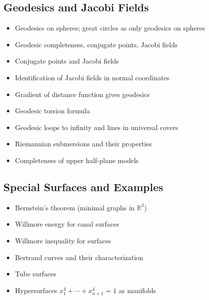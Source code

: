 \documentclass{amsart}
\begin{document}
\subsection{Geodesics and Jacobi Fields}
\begin{itemize}
    \item Geodesics on spheres; great circles as only geodesics on spheres
    \item Geodesic completeness, conjugate points, Jacobi fields
    \item Conjugate points and Jacobi fields
    \item Identification of Jacobi fields in normal coordinates
    \item Gradient of distance function gives geodesics
    \item Geodesic torsion formula
    \item Geodesic loops to infinity and lines in universal covers
    \item Riemannian submersions and their properties
    \item Completeness of upper half-plane models
    \end{itemize}

\subsection{Special Surfaces and Examples}
\begin{itemize}
    \item Bernstein's theorem (minimal graphs in $\mathbb{R}^3$)
    \item Willmore energy for canal surfaces
    \item Willmore inequality for surfaces
    \item Bertrand curves and their characterization
    \item Tube surfaces
    \item Hypersurfaces $x_1^4 + \cdots + x_{n+1}^4 = 1$ as manifolds
    \end{itemize}
\end{document}
